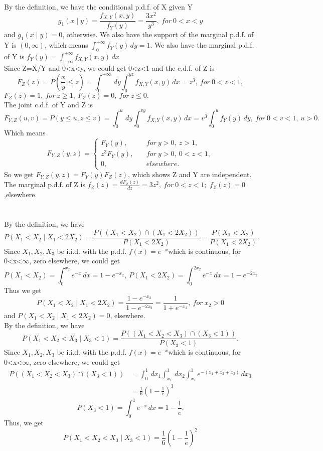 \documentclass[10.5pt]{article}
\begin{document}
\section{}
By the definition, we have the conditional p.d.f. of X given Y $$g_1(x\mid y) = \frac{f_{X,Y}(x,y)}{f_Y(y)} = \frac{3x^2}{y^3}, ~for~0<x<y$$ and $g_1(x\mid y) = 0$, otherwise. We also have the support of the marginal p.d.f. of Y is $(0,\infty)$, which means $\int_0^{+\infty} f_Y(y) \,dy = 1$. We also have the marginal p.d.f. of Y is $f_Y(y) = \int_{-\infty}^{+\infty} f_{X,Y}(x,y) \,dx$\\\indent
Since Z=X/Y and 0<x<y, we could get 0<z<1 and the c.d.f. of Z is $$F_Z(z) = P\left(\frac{x}{y}\leqslant z\right) = \int_{0}^{+\infty} \,dy \int_{0}^{yz} f_{X,Y}(x,y) \,dx = z^3,~for ~0<z<1,$$ $F_Z(z) = 1, ~for ~z\geqslant 1,~F_Z(z) = 0, ~for ~z\leqslant 0.$\\\indent
The joint c.d.f. of Y and Z is $$F_{Y,Z}(u,v) = P(y\leqslant u, z\leqslant v) = \int_0^{u} \,dy \int_0^{vy} f_{X,Y}(x,y) \,dx = v^3 \int_0^u f_Y(y) \,dy, ~for ~0<v<1, ~u>0.$$\indent
Which means $$F_{Y,Z}(y,z) = \left\{\begin{array}{rcl}
    F_Y(y), & & ~for ~y>0,~z>1,\\
    z^3 F_Y(y), & & ~for ~y>0,~0<z<1,\\
    0, & & ~elsewhere.
\end{array}\right.$$\indent
So we get $F_{Y,Z}(y,z) = F_Y(y) F_Z(z)$, which shows Z and Y are independent. The marginal p.d.f. of Z is $f_Z(z) = \frac{d F_Z(z)}{dz} = 3z^2, ~for ~0<z<1;$ $f_Z(z)=0$,elsewhere.

\section{}
\subsection{}
By the definition, we have $$P(X_1<X_2\mid X_1<2X_2) = \frac{P\left((X_1<X_2) \cap (X_1<2X_2)\right)}{P(X_1<2X_2)} = \frac{P(X_1<X_2)}{P(X_1<2X_2)}.$$\indent Since $X_1,X_2,X_3$ be i.i.d. with the p.d.f. $f(x) = e^{-x}$which is continuous, for 0<x<$\infty$, zero elsewhere, we could get $$P(X_1<X_2) = \int_0^{x_2} e^{-x} \,dx = 1-e^{-x_2},~P(X_1<2X_2) = \int_0^{2x_2} e^{-x} \,dx = 1-e^{-2x_2}$$\indent Thus we get $$P(X_1<X_2\mid X_1<2X_2) = \frac{1-e^{-x_2}}{1-e^{-2x_2}} = \frac{1}{1+e^{-x_2}}, ~for ~x_2>0$$ and $P(X_1<X_2\mid X_1<2X_2) = 0$, elsewhere.\\\indent
By the definition, we have $$P(X_1<X_2<X_3\mid X_3<1) = \frac{P\left((X_1<X_2<X_3)\cap (X_3<1)\right)}{P(X_3<1)}.$$\indent
Since $X_1,X_2,X_3$ be i.i.d. with the p.d.f. $f(x) = e^{-x}$which is continuous, for 0<x<$\infty$, zero elsewhere, we could get $$ \begin{aligned}P((X_1<X_2<X_3)\cap (X_3<1))
    &= \int_0^1 \,dx_1 \int_{x_1}^{1} \,dx_2 \int_{x_2}^1 e^{-(x_1+x_2+x_3)} \,dx_3 \\
    &= \frac{1}{6}\left(1-\frac{1}{e}\right)^3
\end{aligned}$$ $$P(X_3<1) = \int_0^1 e^{-x} \,dx = 1-\frac{1}{e}.$$\indent
Thus, we get $$P(X_1<X_2<X_3\mid X_3<1) = \frac{1}{6}\left(1-\frac{1}{e}\right)^2$$
\end{document}
